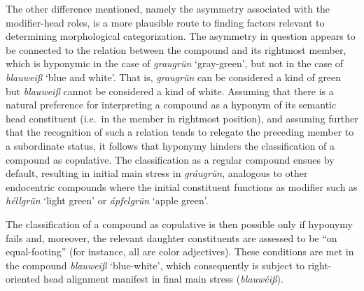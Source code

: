 \documentclass[output=paper
 ,nobabel
 ,draftmode
 ,colorlinks, citecolor=brown
]{langscibook}
\begin{document}
 The other difference mentioned, namely the asymmetry associated with the modifier-head roles, is a
 more plausible route to finding factors relevant to determining morphological categorization. The
 asymmetry in question appears to be connected to the relation between the compound and its
 rightmost member, which is hyponymic in the case of \emph{graugrün} `gray-green', but not in the
 case of \emph{blauweiß} `blue and white'. That is, \emph{graugrün} can be considered a kind of
 green but \emph{blauweiß} cannot be considered a kind of white. Assuming that there is a natural
 preference for interpreting a compound as a hyponym of its semantic head constituent (i.e.\ in
  the member in rightmost position), and assuming further that the recognition of such a
 relation tends to relegate the preceding member to a subordinate status, it follows that hyponymy
 hinders the classification of a compound as copulative. The classification as a regular compound
 ensues by default, resulting in initial main stress in \emph{gráugrün}, analogous to other endocentric compounds where the initial constituent functions as modifier such as \emph{héllgrün} `light green' or \emph{ápfelgrün} `apple green'.
 
The classification of a compound as copulative is then possible only if hyponymy fails and, moreover, the relevant daughter constituents are assessed to be ``on equal-footing'' (for instance, all are color adjectives). These conditions are met in the compound \emph{blauweiß} `blue-white', which consequently is subject to right-oriented head alignment manifest in final main stress (\emph{blauwéiß}). 
\end{document}

